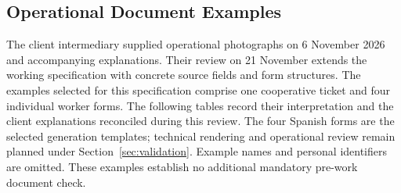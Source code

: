 \subsection{Operational Document Examples}\label{sec:source-examples}
The client intermediary supplied operational photographs on 6 November 2026 and accompanying
explanations. Their review on 21 November extends the working specification with
concrete source fields and form structures. The examples selected for this specification comprise one cooperative
ticket and four individual worker forms. The following
tables record their interpretation and the client explanations reconciled during this review. The four Spanish forms are the selected generation templates; technical rendering and operational review remain planned under Section~\ref{sec:validation}. Example
names and personal identifiers are omitted. These examples establish no additional
mandatory pre-work document check.


